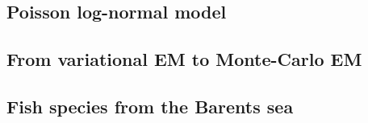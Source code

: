\subsection*{Poisson log-normal model} 

\subsection{From variational EM to Monte-Carlo EM} 

\subsection{Fish species from the Barents sea}

